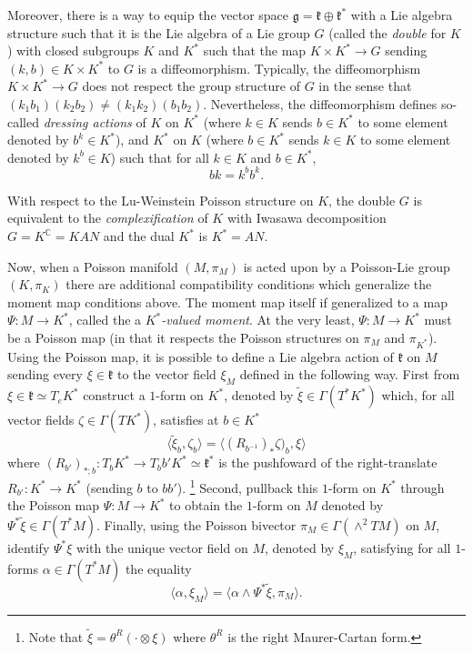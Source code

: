 \documentclass[notitlepage]{article}
\begin{document}
Moreover, there is a way to equip the vector space $\mathfrak g = \mathfrak k \oplus \mathfrak k^{*}$ with a Lie algebra structure such that it is the Lie algebra of a Lie group $G$ (called the \textit{double} for $K$) with closed subgroups $K$ and $K^{*}$ such that the map $K \times K^{*} \to G$ sending $(k,b) \in K \times K^{*}$ to $G$ is a diffeomorphism.
Typically, the diffeomorphism $K \times K^{*} \to G$ does not respect the group structure of $G$ in the sense that $(k_1b_1)(k_2b_2) \neq (k_1k_2)(b_1b_2)$.
Nevertheless, the diffeomorphism defines so-called \textit{dressing actions} of $K$ on $K^{*}$ (where $k \in K$ sends $b \in K^{*}$ to some element denoted by $b^{k} \in K^{*}$), and $K^{*}$ on $K$ (where $b \in K^{*}$ sends $k \in K$ to some element denoted by $k^{b} \in K$) such that for all $k \in K$ and $b \in K^{*}$, 
\begin{equation}
    bk = k^{b} b^{k}.
\end{equation}

With respect to the Lu-Weinstein Poisson structure on $K$, the double $G$ is equivalent to the \textit{complexification} of $K$ with Iwasawa decomposition $G = K^{\mathbb C} = KAN$ and the dual $K^{*}$ is $K^{*} = AN$.

Now, when a Poisson manifold $(M, \pi_M)$ is acted upon by a Poisson-Lie group $(K, \pi_K)$ there are additional compatibility conditions which generalize the moment map conditions above.
The moment map itself if generalized to a map $\Psi : M \to K^{*}$, called the a \textit{$K^{*}$-valued moment}.
At the very least, $\Psi : M \to K^{*}$ must be a Poisson map (in that it respects the Poisson structures on $\pi_M$ and $\pi_{K^{*}}$).
Using the Poisson map, it is possible to define a Lie algebra action of $\mathfrak k$ on $M$ sending every $\xi \in \mathfrak k$ to the vector field $\xi_M$ defined in the following way.
First from $\xi \in \mathfrak k \simeq T_e K^{*}$ construct a $1$-form on $K^{*}$, denoted by $\tilde \xi \in \Gamma(T^{*} K^{*})$ which, for all vector fields $\zeta \in \Gamma(TK^{*})$, satisfies at $b \in K^{*}$
\begin{equation}
    \langle \tilde \xi_b, \zeta_b \rangle = \langle (R_{b^{-1}})_{*}\zeta)_b, \xi \rangle
\end{equation}
where $(R_{b'})_{*;b} : T_b K^{*} \to T_bb' K^{*} \simeq \mathfrak k^{*}$ is the pushfoward of the right-translate $R_{b'} : K^{*} \to K^{*}$ (sending $b$ to $b b'$).%
\footnote{
    Note that $\tilde \xi = \theta^{R}(\cdot \otimes \xi)$ where $\theta^{R}$ is the right Maurer-Cartan form.
}
Second, pullback this $1$-form on $K^{*}$ through the Poisson map $\Psi : M \to K^{*}$ to obtain the $1$-form on $M$ denoted by $\Psi^{*}\tilde \xi \in \Gamma(T^* M)$. 
Finally, using the Poisson bivector $\pi_M \in \Gamma(\wedge^2 TM)$ on $M$, identify $\Psi^{*} \xi$ with the unique vector field on $M$, denoted by $\xi_M$, satisfying for all $1$-forms $\alpha \in \Gamma(T^{*} M)$ the equality
\begin{equation}
    \langle \alpha, \xi_M \rangle = \langle \alpha \wedge \Psi^{*} \tilde \xi, \pi_M \rangle.
\end{equation}
\end{document}

